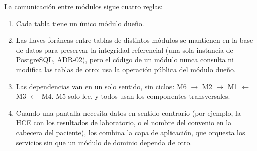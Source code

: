 \documentclass[11pt,a4paper]{article}
\begin{document}
La comunicación entre módulos sigue cuatro reglas:

\begin{enumerate}[nosep]
  \item Cada tabla tiene un único módulo dueño.
  \item Las llaves foráneas entre tablas de distintos módulos se mantienen en la base de datos para
        preservar la integridad referencial (una sola instancia de PostgreSQL, ADR-02), pero el
        código de un módulo nunca consulta ni modifica las tablas de otro: usa la operación pública
        del módulo dueño.
  \item Las dependencias van en un solo sentido, sin ciclos: M6 $\rightarrow$ M2 $\rightarrow$ M1
        $\leftarrow$ M3 $\leftarrow$ M4. M5 solo lee, y todos usan los componentes transversales.
  \item Cuando una pantalla necesita datos en sentido contrario (por ejemplo, la HCE con los
        resultados de laboratorio, o el nombre del convenio en la cabecera del paciente), los combina
        la capa de aplicación, que orquesta los servicios sin que un módulo de dominio dependa de otro.
\end{enumerate}
\end{document}
